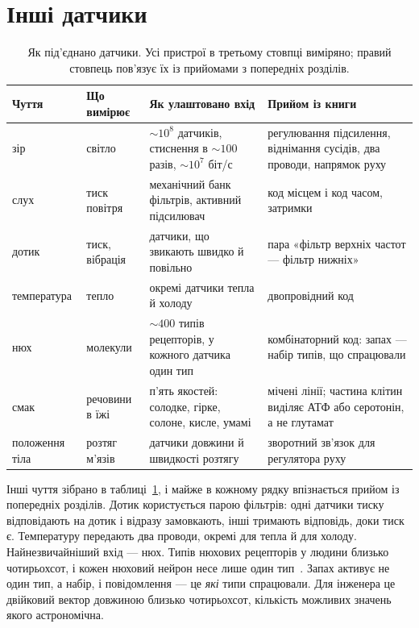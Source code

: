 \section{Інші датчики}

\begin{table}[t]
\centering
\footnotesize
\setlength{\tabcolsep}{3pt}
\renewcommand{\arraystretch}{1.15}
\begin{tabular}{>{\raggedright}p{1.9cm}>{\raggedright}p{2.6cm}>{\raggedright}p{4.0cm}>{\raggedright\arraybackslash}p{4.6cm}}
\toprule
Чуття & Що вимірює & Як улаштовано вхід & Прийом із книги \\
\midrule
зір & світло & $\sim10^8$ датчиків, стиснення в $\sim100$ разів, $\sim10^7$ біт/с & регулювання підсилення, віднімання сусідів, два проводи, напрямок руху \\
слух & тиск повітря & механічний банк фільтрів, активний підсилювач & код місцем і код часом, затримки \\
дотик & тиск, вібрація & датчики, що звикають швидко й повільно & пара «фільтр верхніх частот --- фільтр нижніх» \\
температура & тепло & окремі датчики тепла й холоду & двопровідний код \\
нюх & молекули & $\sim400$ типів рецепторів, у кожного датчика один тип & комбінаторний код: запах --- набір типів, що спрацювали \\
смак & речовини в їжі & п'ять якостей: солодке, гірке, солоне, кисле, умамі & мічені лінії; частина клітин виділяє АТФ або серотонін, а не глутамат \\
положення тіла & розтяг м'язів & датчики довжини й швидкості розтягу & зворотний зв'язок для регулятора руху \\
\bottomrule
\end{tabular}
\caption{Як під'єднано датчики. Усі пристрої в третьому стовпці виміряно; правий стовпець пов'язує їх із прийомами з попередніх розділів.}
\label{tab:sensors}
\end{table}

Інші чуття зібрано в таблиці~\ref{tab:sensors}, і майже в кожному рядку впізнається прийом із попередніх розділів. Дотик користується парою фільтрів: одні датчики тиску відповідають на дотик і відразу замовкають, інші тримають відповідь, доки тиск є. Температуру передають два проводи, окремі для тепла й для холоду. Найнезвичайніший вхід --- нюх. Типів нюхових рецепторів у людини близько чотирьохсот, і кожен нюховий нейрон несе лише один тип~\cite{Mombaerts2004}. Запах активує не один тип, а набір, і повідомлення --- це \emph{які} типи спрацювали. Для інженера це двійковий вектор довжиною близько чотирьохсот, кількість можливих значень якого астрономічна.

